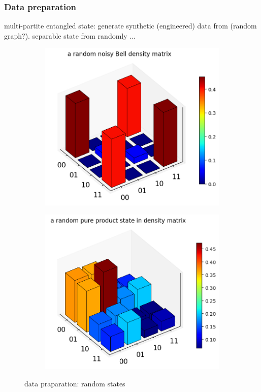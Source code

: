 \documentclass[
10pt,
aps,
pra,
linenumbers,
floatfix,
]{revtex4-2}
\theoremstyle{plain}
\theoremstyle{definition}
\begin{document}
\subsubsection{Data preparation}
multi-partite entangled state: generate synthetic (engineered) data from (random graph?).
separable state from randomly ...
\begin{figure}[!ht]
	\centering
	\begin{subfigure}{0.45\textwidth}
	\centering
		\includegraphics[width=.9\linewidth]{noisy_bell.png}
	\end{subfigure}
	\begin{subfigure}{0.45\textwidth}
	\centering
		\includegraphics[width=.9\linewidth]{random_2qubit_pure_product_state.png}
	\end{subfigure}
	\caption{data praparation: random states}
\end{figure}
\end{document}
